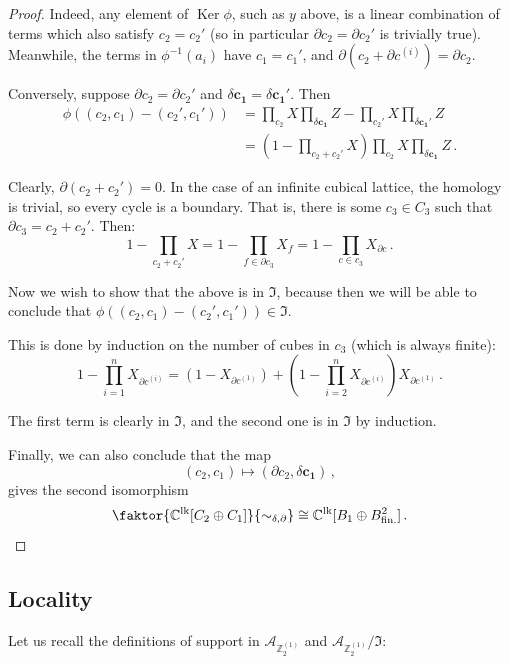 \documentclass[aps,twocolumn,prx,floatfix,preprintnumbers, nofootinbib,10pt]{revtex4-2}
\numberwithin{equation}{section}
\theoremstyle{definition}
\theoremstyle{remark}
\theoremstyle{claim}
\newcommand{\be}{\begin{equation}}
\newcommand{\ee}{\end{equation}}
\renewcommand{\ker}{\operatorname{Ker}}
\newcommand{\Z}{{\mathbb Z}}
\newcommand{\mc}[1]{\mathcal{#1}}
\newcommand{\paren}[1]{\left( #1 \right)}
\begin{document}
\begin{proof}
 Indeed, any element of $\ker \phi$, such as $y$ above, is a linear combination of terms which also satisfy $c_2 = c_2'$ (so in particular $\partial c_2 = \partial c_2'$ is trivially true). Meanwhile, the terms in $\phi^{-1}(a_i)$ have $c_1 = c_1'$, and $\partial (c_2 + \partial c^{(i)}) = \partial c_2$.

 Conversely, suppose $\partial c_2 = \partial c_2'$ and $\delta \bm{c_1} = \delta \bm{c_1'}$. Then
 \begin{align}
  \phi \paren{(c_2, c_1) - (c_2', c_1')} &= \prod_{c_2} X \prod_{\delta \bm{c_1}} Z - \prod_{c_2'} X \prod_{\delta \bm{c_1'}} Z \nonumber \\
  &= \paren{1 - \prod_{c_2 + c_2'} X } \prod_{c_2} X \prod_{\delta \bm{c_1}} Z \,.
 \end{align}

 Clearly, $\partial (c_2 + c_2') = 0$. In the case of an infinite cubical lattice, the homology is trivial, so every cycle is a boundary. That is, there is some $c_3 \in C_3$ such that $\partial c_3 = c_2 + c_2'$. Then:
 \be
 1 - \prod_{c_2 + c_2'} X = 1 - \prod_{f \in \partial c_3} X_f = 1 - \prod_{c \in c_3} X_{\partial c} \,.
 \ee

 Now we wish to show that the above is in $\mathfrak{I}$, because then we will be able to conclude that $\phi \paren{(c_2, c_1) - (c_2', c_1')} \in \mathfrak{I}$.

 This is done by induction on the number of cubes in $c_3$ (which is always finite):
 \be
 1 - \prod_{i=1}^n X_{\partial c^{(i)}} = \paren{1 - X_{\partial c^{(1)}}} + \paren{1 - \prod_{i=2}^n X_{\partial c^{(i)}}} X_{\partial c^{(1)}} \,.
 \ee

 The first term is clearly in $\mathfrak{I}$, and the second one is in $\mathfrak{I}$ by induction.

 Finally, we can also conclude that the map
 \be
 (c_2, c_1) \longmapsto (\partial c_2, \delta \bm{c_1}) \,,
 \ee
 gives the second isomorphism
 \be
 \faktor{\mathbb{C}^\text{lk}[C_2 \oplus C_1]}{\sim_{\delta, \partial}} \cong \mathbb{C}^\text{lk}[B_1 \oplus B^2_\text{fin.}] \,.
 \ee
\end{proof}

\subsection{Locality}

Let us recall the definitions of support in $\mc{A}_{\Z_2^{(1)}}$ and $\mc{A}_{\Z_2^{(1)}} / \mathfrak{I}$:
\end{document}
